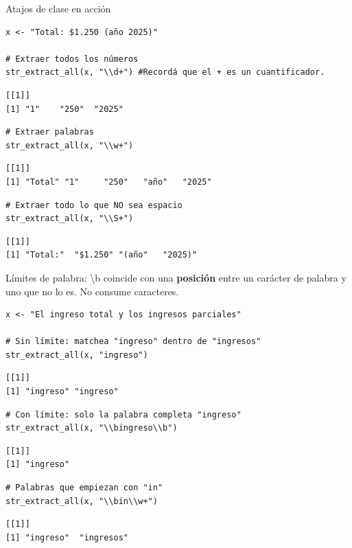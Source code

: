 \documentclass[8pt]{beamer}
\begin{document}
\begin{frame}[fragile]{Atajos de clase en acción}
\begin{lstlisting}[style=RScript]
x <- "Total: $1.250 (año 2025)"

# Extraer todos los números
str_extract_all(x, "\\d+") #Recordá que el + es un cuantificador.
\end{lstlisting}
\begin{lstlisting}[style=RConsole]
[[1]]
[1] "1"    "250"  "2025"
\end{lstlisting}
\begin{lstlisting}[style=RScript]
# Extraer palabras
str_extract_all(x, "\\w+")
\end{lstlisting}
\begin{lstlisting}[style=RConsole]
[[1]]
[1] "Total" "1"     "250"   "año"   "2025"
\end{lstlisting}
\begin{lstlisting}[style=RScript]
# Extraer todo lo que NO sea espacio
str_extract_all(x, "\\S+")
\end{lstlisting}
\begin{lstlisting}[style=RConsole]
[[1]]
[1] "Total:"  "$1.250" "(año"   "2025)"
\end{lstlisting}
\end{frame}




\begin{frame}[fragile]{Límites de palabra: \textbackslash b}
	 coincide con una \textbf{posición} entre un carácter de palabra y uno que no lo es. No consume caracteres.
\begin{lstlisting}[style=RScript]
x <- "El ingreso total y los ingresos parciales"

# Sin límite: matchea "ingreso" dentro de "ingresos"
str_extract_all(x, "ingreso")
\end{lstlisting}
\begin{lstlisting}[style=RConsole]
[[1]]
[1] "ingreso" "ingreso"
\end{lstlisting}
\begin{lstlisting}[style=RScript]
# Con límite: solo la palabra completa "ingreso"
str_extract_all(x, "\\bingreso\\b")
\end{lstlisting}
\begin{lstlisting}[style=RConsole]
[[1]]
[1] "ingreso"
\end{lstlisting}
\begin{lstlisting}[style=RScript]
# Palabras que empiezan con "in"
str_extract_all(x, "\\bin\\w+")
\end{lstlisting}
\begin{lstlisting}[style=RConsole]
[[1]]
[1] "ingreso"  "ingresos"
\end{lstlisting}
\end{frame}
\end{document}
